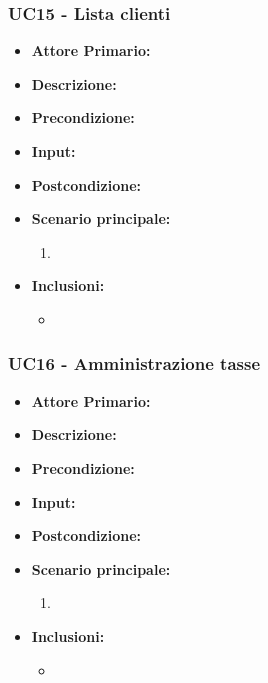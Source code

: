 \subsubsection{UC15 - Lista clienti}
\begin{itemize}
    \item \textbf{Attore Primario:} 
    \item \textbf{Descrizione:}
    \item \textbf{Precondizione:}
    \item \textbf{Input:}
    \item \textbf{Postcondizione:}
    \item \textbf{Scenario principale:}
    \begin{enumerate}
        \item 
    \end{enumerate}
    \item \textbf{Inclusioni:}
    \begin{itemize}
        \item
    \end{itemize}
\end{itemize}
\subsubsection{UC16 - Amministrazione tasse}
\begin{itemize}
    \item \textbf{Attore Primario:} 
    \item \textbf{Descrizione:}
    \item \textbf{Precondizione:}
    \item \textbf{Input:}
    \item \textbf{Postcondizione:}
    \item \textbf{Scenario principale:}
    \begin{enumerate}
        \item 
    \end{enumerate}
    \item \textbf{Inclusioni:}
    \begin{itemize}
        \item
    \end{itemize}
\end{itemize}
